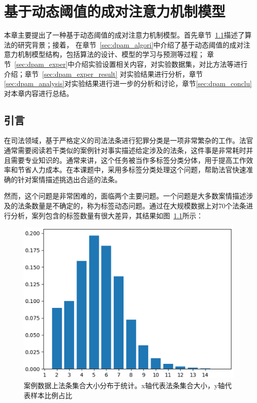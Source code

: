 
\chapter{基于动态阈值的成对注意力机制模型}
本章主要提出了一种基于动态阈值的成对注意力机制模型。首先章节~\ref{sec:dpam_intro}描述了算法的研究背景；接着，
在章节~\ref{sec:dpam_algori}中介绍了基于动态阈值的成对注意力机制模型结构，包括算法的设计、模型的学习与预测等过程；
章节~\ref{sec:dpam_exper}中介绍实验设置相关内容，对实验数据集，对比方法等进行介绍；章节~\ref{sec:dpam_exper_result}
对实验结果进行分析，章节\ref{sec:dpam_analysis}对实验结果进行进一步的分析和讨论，章节\ref{sec:dpam_conclu}对本章内容进行总结。

\section{引言}
\label{sec:dpam_intro}

在司法领域，基于严格定义的司法法条进行犯罪分类是一项非常繁杂的工作。法官通常需要阅读若干类似的案例针对事实描述给定涉及的法条，这件事是非常耗时并且需要专业知识的。通常来讲，这个任务被当作多标签分类分体，用于提高工作效率和节省人力成本。在本课题中，采用多标签分类处理这个问题，帮助法官快速准确的针对案情描述挑选出合适的法条。

然而，这个问题是非常困难的，面临两个主要问题。一个问题是大多数案情描述涉及的法条数量是不确定的，称为标签动态问题。通过在大规模数据上对70个法条进行分析，案列包含的标签数量有很大差异，其结果如图~\ref{fig:dis1}所示：
\begin{figure}[htbp]
\centering
\includegraphics[scale=0.5,viewport=0 0 450 350,clip=true]{./sources/1.eps}
\caption{\label{fig:dis1}案例数据上法条集合大小分布于统计。x轴代表法条集合大小，y轴代表样本比例占比}
\end{figure}

